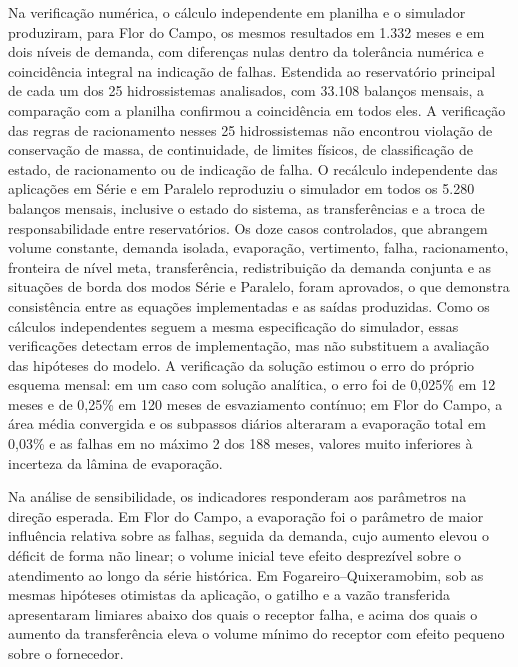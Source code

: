 Na verificação numérica, o cálculo independente em planilha e o simulador produziram, para Flor do Campo, os mesmos resultados em 1.332 meses e em dois níveis de demanda, com diferenças nulas dentro da tolerância numérica e coincidência integral na indicação de falhas. Estendida ao reservatório principal de cada um dos 25 hidrossistemas analisados, com 33.108 balanços mensais, a comparação com a planilha confirmou a coincidência em todos eles. A verificação das regras de racionamento nesses 25 hidrossistemas não encontrou violação de conservação de massa, de continuidade, de limites físicos, de classificação de estado, de racionamento ou de indicação de falha. O recálculo independente das aplicações em Série e em Paralelo reproduziu o simulador em todos os 5.280 balanços mensais, inclusive o estado do sistema, as transferências e a troca de responsabilidade entre reservatórios. Os doze casos controlados, que abrangem volume constante, demanda isolada, evaporação, vertimento, falha, racionamento, fronteira de nível meta, transferência, redistribuição da demanda conjunta e as situações de borda dos modos Série e Paralelo, foram aprovados, o que demonstra consistência entre as equações implementadas e as saídas produzidas. Como os cálculos independentes seguem a mesma especificação do simulador, essas verificações detectam erros de implementação, mas não substituem a avaliação das hipóteses do modelo. A verificação da solução estimou o erro do próprio esquema mensal: em um caso com solução analítica, o erro foi de 0,025\% em 12 meses e de 0,25\% em 120 meses de esvaziamento contínuo; em Flor do Campo, a área média convergida e os subpassos diários alteraram a evaporação total em 0,03\% e as falhas em no máximo 2 dos 188 meses, valores muito inferiores à incerteza da lâmina de evaporação.

Na análise de sensibilidade, os indicadores responderam aos parâmetros na direção esperada. Em Flor do Campo, a evaporação foi o parâmetro de maior influência relativa sobre as falhas, seguida da demanda, cujo aumento elevou o déficit de forma não linear; o volume inicial teve efeito desprezível sobre o atendimento ao longo da série histórica. Em Fogareiro--Quixeramobim, sob as mesmas hipóteses otimistas da aplicação, o gatilho e a vazão transferida apresentaram limiares abaixo dos quais o receptor falha, e acima dos quais o aumento da transferência eleva o volume mínimo do receptor com efeito pequeno sobre o fornecedor.

